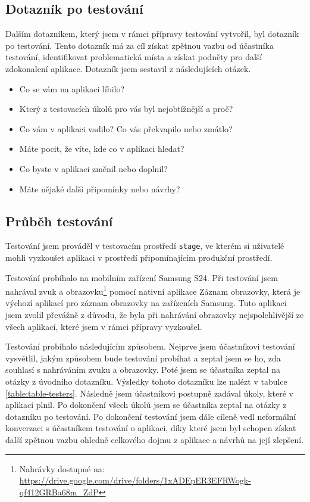 \subsection{Dotazník po testování}

Dalším dotazníkem, který jsem v rámci přípravy testování vytvořil, byl dotazník po testování. Tento dotazník má za cíl získat zpětnou vazbu od účastníka testování, identifikovat problematická místa a získat podněty pro další zdokonalení aplikace. Dotazník jsem sestavil z následujících otázek.

\begin{itemize}
    \item Co se vám na aplikaci líbilo?
    \item Který z testovacích úkolů pro vás byl nejobtížnější a proč?
    \item Co vám v aplikaci vadilo? Co vás překvapilo nebo zmátlo?
    \item Máte pocit, že víte, kde co v aplikaci hledat?
    \item Co byste v aplikaci změnil nebo doplnil?
    \item Máte nějaké další připomínky nebo návrhy?
\end{itemize}

\subsection{Průběh testování}

Testování jsem prováděl v testovacím prostředí \texttt{stage}, ve kterém si uživatelé mohli vyzkoušet aplikaci v prostředí připomínajícím produkční prostředí.

Testování probíhalo na mobilním zařízení Samsung S24. Při testování jsem nahrával zvuk a obrazovku\footnote{Nahrávky dostupné na: \href{https://drive.google.com/drive/folders/1xADEpER3EFRWogk-qf412GRBa68m\_ZdP}{https://drive.google.com/drive/folders/1xADEpER3EFRWogk-qf412GRBa68m\_ZdP}} pomocí nativní aplikace Záznam obrazovky, která je výchozí aplikací pro záznam obrazovky na zařízeních Samsung. Tuto aplikaci jsem zvolil převážně z důvodu, že byla při nahrávání obrazovky nejspolehlivější ze všech aplikací, které jsem v rámci přípravy vyzkoušel.

Testování probíhalo následujícím způsobem. Nejprve jsem účastníkovi testování vysvětlil, jakým způsobem bude testování probíhat a zeptal jsem se ho, zda souhlasí s nahráváním zvuku a obrazovky. Poté jsem se účastníka zeptal na otázky z úvodního dotazníku. Výsledky tohoto dotazníku lze nalézt v tabulce \ref{table:table-testers}. Následně jsem účastníkovi postupně zadával úkoly, které v aplikaci plnil. Po dokončení všech úkolů jsem se účastníka zeptal na otázky z dotazníku po testování. Po dokončení testování jsem dále cíleně vedl neformální konverzaci s účastníkem testování o aplikaci, díky které jsem byl schopen získat další zpětnou vazbu ohledně celkového dojmu z aplikace a návrhů na její zlepšení.

